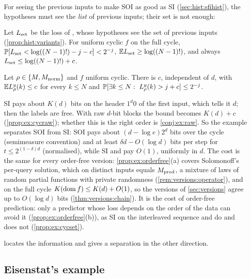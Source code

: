 For seeing the previous inputs to make SOI as good as SI (\cref{sec:hist:sfihist}), the hypotheses must see the \emph{list} of previous inputs; their set is not enough:

\begin{proposition}[\SFIset]\label{prop:ex:cycset}
Let $L_{\rm set}$ be the loss of \SFIset{}, whose hypotheses see the set of previous inputs (\cref{prop:hist:variants}). For uniform cyclic $f$ on the full cycle, $\mathbb{P}[L_{\rm set}<\log((N-1)!)-j-c]<2^{-j}$, $\mathbb{E} L_{\rm set}\ge\log((N-1)!)$, and always $L_{\rm set}\le\log((N-1)!)+c$.
\end{proposition}

\begin{proposition}[SI]\label{prop:ex:cycsi}
Let $\rho\in\{M,M_{\mathrm{norm}}\}$ and $f$ uniform cyclic. There is $c$, independent of $d$, with $\mathbb{E} L^y_\rho(k)\le c$ for every $k\le N$ and $\Prob[\exists k\le N:\ L^y_\rho(k)>j+c]\le2^{-j}$.
\end{proposition}

SI pays about $K(d)$ bits on the header $1^d0$ of the first input, which tells it $d$; then the labels are free. With raw $d$-bit blocks the bound becomes $K(d)+c$ (\cref{prop:ex:cycraw}); whether this is the right order is \cref{conj:ex:raw}. So the example separates SOI from SI: SOI pays about $(d-\log e)2^d$ bits over the cycle (semimeasure convention) and at least $\delta d-O(\log d)$ bits per step for $t\le2^{(1-\delta)d}$ (normalised), while SI and \SFIhist{} pay $O(1)$, uniformly in $d$. The cost is the same for every order-free version: \cref{prop:ex:orderfree}(a) covers Solomonoff's per-query solution, which on distinct inputs equals $M_{\mathrm{prod}}$, a mixture of laws of random partial functions with private randomness (\cref{rem:versions:operator}), and on the full cycle $K(\operatorname{dom} f)\le K(d)+O(1)$, so the versions of \cref{sec:versions} agree up to $O(\log d)$ bits (\cref{thm:versions:chain}). It is the cost of order-free prediction: only a predictor whose loss depends on the order of the data can avoid it (\cref{prop:ex:orderfree}(b)), as SI on the interleaved sequence and \SFIhist{} do and \SFIset{} does not (\cref{prop:ex:cycset}).

 locates the information and gives a separation in the other direction.

\subsection{Eisenstat's example}\label{sec:ex:eisenstat}

